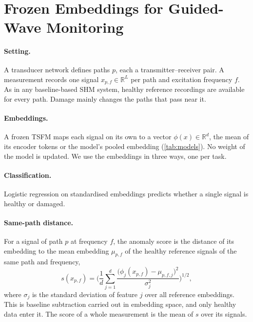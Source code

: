\documentclass{article}
\begin{document}
\section{Frozen Embeddings for Guided-Wave Monitoring}
\label{sec:method}

\paragraph{Setting.}
A transducer network defines paths $p$, each a transmitter--receiver pair. A measurement records one
signal $x_{p,f}\in\mathbb{R}^L$ per path and excitation frequency $f$. As in any baseline-based SHM
system, healthy reference recordings are available for every path. Damage mainly changes the paths that
pass near it.

\paragraph{Embeddings.}
A frozen TSFM maps each signal on its own to a vector $\phi(x)\in\mathbb{R}^d$, the mean of its encoder
tokens or the model's pooled embedding (\cref{tab:models}). No weight of the model is updated. We use the
embeddings in three ways, one per task.

\paragraph{Classification.}
Logistic regression on standardised embeddings predicts whether a single signal is healthy or damaged.

\paragraph{Same-path distance.}
For a signal of path $p$ at frequency $f$, the anomaly score is the distance of its embedding to the
mean embedding $\mu_{p,f}$ of the healthy reference signals of the same path and frequency,
\begin{equation}
  s(x_{p,f}) = \Big(\frac{1}{d}\sum_{j=1}^{d}\frac{\big(\phi_j(x_{p,f})-\mu_{p,f,j}\big)^2}{\sigma_j^2}\Big)^{1/2},
  \label{eq:samepath}
\end{equation}
where $\sigma_j$ is the standard deviation of feature $j$ over all reference embeddings. This is baseline
subtraction carried out in embedding space, and only healthy data enter it. The score of a whole
measurement is the mean of $s$ over its signals.
\end{document}
